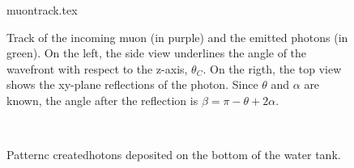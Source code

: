  \begin{figure}
  \centering
  \def\svgwidth{0.7\textwidth}
  {muontrack.tex}
  \caption{Track of the incoming muon (in purple) and the emitted photons (in green).
    On the left, the side view underlines the angle of the wavefront with respect to the z-axis, %
    $\theta_C$.
    On the rigth, the top view shows the xy-plane reflections of the photon.
    Since $\theta$ and $\alpha$ are known, the angle after the reflection is %
    $\beta = \pi - \theta+2\alpha$.}
  \label{fig:muontrack}
 \end{figure}

\begin{figure}
  \centering
   \hfill 
   \\
   \hfill 
    \caption{Patternc createdhotons deposited on the bottom of the water tank.}
  \label{fig:pattern}
\end{figure}
